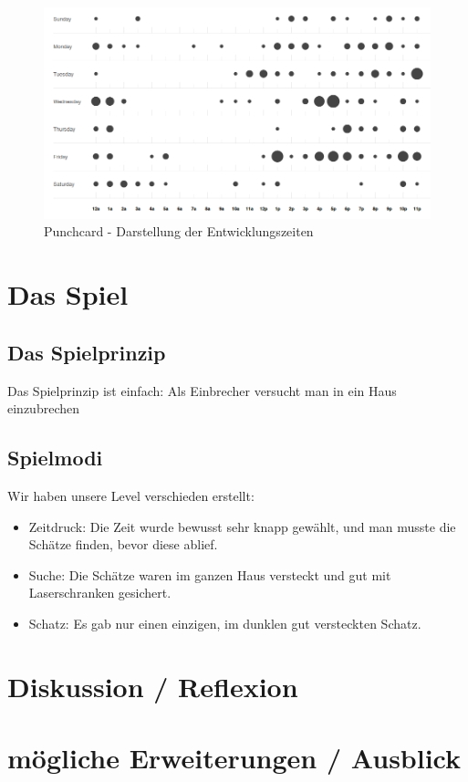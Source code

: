 \documentclass[12pt,a4paper]{scrartcl}
\begin{document}
\begin{figure}[h]
\centering
\includegraphics[scale=0.4]{img/punchcard.png}
\caption{Punchcard - Darstellung der Entwicklungszeiten}
\label{fig:punchcard}
\end{figure}

\section{Das Spiel}
\subsection{Das Spielprinzip}
Das Spielprinzip ist einfach: Als Einbrecher versucht man in ein Haus einzubrechen

\subsection{Spielmodi}
Wir haben unsere Level verschieden erstellt:
\begin{itemize}
\item Zeitdruck: Die Zeit wurde bewusst sehr knapp gewählt, und man musste die Schätze finden, bevor diese ablief.
\item Suche: Die Schätze waren im ganzen Haus versteckt und gut mit Laserschranken gesichert.
\item Schatz: Es gab nur einen einzigen, im dunklen gut versteckten Schatz.
\end{itemize}

\newpage
\section{Diskussion / Reflexion}

\newpage
\section{mögliche Erweiterungen / Ausblick}


\clearpage
\listoffigures
\end{document}
